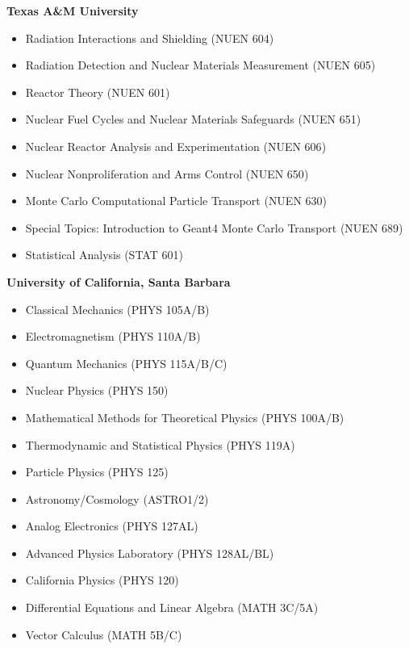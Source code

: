 \documentclass[margin, 10pt]{style/res} %
\begin{document}
\begin{resume}
\textbf{Texas A\&M University}\\[-2.3ex]
\begin{itemize}[leftmargin=4ex] \itemsep -2pt
\item Radiation Interactions and Shielding ({\footnotesize{NUEN 604}})
\item Radiation Detection and Nuclear Materials Measurement ({\footnotesize{NUEN 605}})
\item Reactor Theory ({\footnotesize{NUEN 601}})
\item Nuclear Fuel Cycles and Nuclear Materials Safeguards ({\footnotesize{NUEN 651}})
\item Nuclear Reactor Analysis and Experimentation ({\footnotesize{NUEN 606}})
\item Nuclear Nonproliferation and Arms Control ({\footnotesize{NUEN 650}})
\item Monte Carlo Computational Particle Transport ({\footnotesize{NUEN 630}})
\item Special Topics: Introduction to Geant4 Monte Carlo Transport ({\footnotesize{NUEN 689}})
\item Statistical Analysis ({\footnotesize{STAT 601}})
\end{itemize}

\textbf{University of California, Santa Barbara}\\[-2.3ex]
\begin{itemize}[leftmargin=4ex] \itemsep -2pt
\item Classical Mechanics ({\footnotesize{PHYS 105A/B}}) 
\item Electromagnetism ({\footnotesize{PHYS 110A/B}}) 
\item Quantum Mechanics ({\footnotesize{PHYS 115A/B/C}}) 
\item Nuclear Physics ({\footnotesize{PHYS 150}}) 
\item Mathematical Methods for Theoretical Physics ({\footnotesize{PHYS 100A/B}}) 
\item Thermodynamic and Statistical Physics ({\footnotesize{PHYS 119A}}) 
\item Particle Physics ({\footnotesize{PHYS 125}}) 
\item Astronomy/Cosmology ({\footnotesize{ASTRO1/2}})
\item Analog Electronics ({\footnotesize{PHYS 127AL}}) 
\item Advanced Physics Laboratory ({\footnotesize{PHYS 128AL/BL}}) 
\item California Physics ({\footnotesize{PHYS 120}})
\item Differential Equations and Linear Algebra ({\footnotesize{MATH 3C/5A}}) 
\item Vector Calculus ({\footnotesize{MATH 5B/C}}) 
\end{itemize}


\end{resume}
\end{document}
